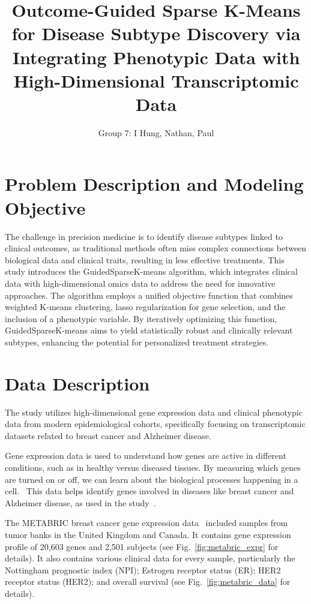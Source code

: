 \documentclass{statsoc}
\title[GuidedSparseKmeans]{Outcome-Guided Sparse K-Means for Disease Subtype Discovery via Integrating Phenotypic Data with High-Dimensional Transcriptomic Data}
\author[]{Group 7: I Hung, Nathan, Paul}
\begin{document}
\section{Problem Description and Modeling Objective}

The challenge in precision medicine is to identify disease subtypes linked to clinical outcomes, as traditional methods often miss complex connections between biological data and clinical traits, resulting in less effective treatments. This study introduces the GuidedSparseK-means algorithm, which integrates clinical data with high-dimensional omics data to address the need for innovative approaches. The algorithm employs a unified objective function that combines weighted K-means clustering, lasso regularization for gene selection, and the inclusion of a phenotypic variable. By iteratively optimizing this function, GuidedSparseK-means aims to yield statistically robust and clinically relevant subtypes, enhancing the potential for personalized treatment strategies.

\section{Data Description}

The study utilizes high-dimensional gene expression data and clinical phenotypic data from modern epidemiological cohorts, specifically focusing on transcriptomic datasets related to breast cancer and Alzheimer disease.

Gene expression data is used to understand how genes are active in different conditions, such as in healthy versus diseased tissues. By measuring which genes are turned on or off, we can learn about the biological processes happening in a cell.~\citep{emilsson2008genetics} This data helps identify genes involved in diseases like breast cancer and Alzheimer disease, as used in the study~\citep{meng2022outcome}.

The METABRIC breast cancer gene expression data~\citep{curtis2012genomic} included samples from tumor banks in the United Kingdom and Canada. It contains gene expression profile of 20,603 genes and 2,501 subjects (see Fig.~\ref{fig:metabric_expr} for details). It also contains various clinical data for every sample, particularly the Nottingham prognostic index (NPI); Estrogen receptor status (ER); HER2 receptor status (HER2); and overall survival (see Fig.~\ref{fig:metabric_data} for details).
\end{document}
